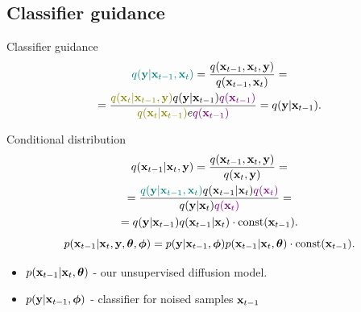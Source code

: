 \documentclass{beamer}
\begin{document}
\subsection{Classifier guidance}
\begin{frame}{Classifier guidance}
	\vspace{-0.5cm}
	\begin{multline*}
		{\color{teal}q(\by | \bx_{t - 1}, \bx_t)} = \frac{q(\bx_{t - 1}, \bx_t, \by)}{q(\bx_{t - 1}, \bx_t)} = \\
		= \frac{{\color{olive}q(\bx_t | \bx_{t - 1}, \by)} q(\by | \bx_{t - 1}) \color{violet}{q(\bx_{t - 1})}} {{\color{olive}q(\bx_t | \bx_{t - 1})}e \color{violet}{q(\bx_{t - 1})}} = q(\by | \bx_{t - 1}).
	\end{multline*}
	\vspace{-0.4cm}
	\begin{block}{Conditional distribution}
		\vspace{-0.7cm}
		\begin{multline*}
			q(\mathbf{x}_{t - 1} | \mathbf{x}_t, \mathbf{y}) = \frac{q(\mathbf{x}_{t - 1}, \mathbf{x}_t, \mathbf{y})}{q(\mathbf{x}_t, \mathbf{y})}  = \\ 
			=  \frac{{\color{teal}q(\mathbf{y} | \mathbf{x}_{t - 1}, \mathbf{x}_t)} q(\mathbf{x}_{t - 1} | \mathbf{x}_t) {\color{violet}q(\mathbf{x}_t)}}{q(\mathbf{y} | \mathbf{x}_t) {\color{violet}q(\mathbf{x}_t)}} = \\
			= q(\mathbf{y} | \mathbf{x}_{t - 1}) q(\mathbf{x}_{t - 1} | \mathbf{x}_t) \cdot \text{const}(\mathbf{x}_{t - 1}).
		\end{multline*}
		\[
			p(\mathbf{x}_{t - 1} | \mathbf{x}_t, \mathbf{y}, \boldsymbol{\theta} , \boldsymbol{\phi}) = p(\mathbf{y} | \mathbf{x}_{t-1}, \boldsymbol{\phi}) p(\mathbf{x}_{t-1} | \mathbf{x}_t, \boldsymbol{\theta}) \cdot \text{const}(\mathbf{x}_{t - 1}).
		\]
		\vspace{-0.4cm}
		\begin{itemize}
			\item $p(\mathbf{x}_{t-1} | \mathbf{x}_t, \boldsymbol{\theta})$ - our unsupervised diffusion model.
			\item $p(\mathbf{y} | \mathbf{x}_{t-1}, \boldsymbol{\phi})$ - classifier for noised samples $\mathbf{x}_{t-1}$
		\end{itemize}
	\end{block}
\end{frame}
\end{document}
